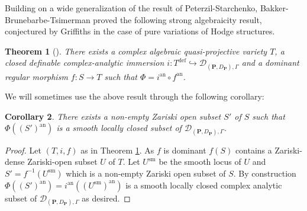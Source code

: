 \documentclass[10pt]{article}
\numberwithin{equation}{subsection}
\theoremstyle{plain}
\newtheorem{theorem}{Theorem}[section]
\newtheorem{corollary}[theorem]{Corollary}
\theoremstyle{definition}
\theoremstyle{remark}
\newcommand{\sm}{\mathrm{sm}}
\newcommand{\pp}{\mathbf P}
\newcommand{\an}{\mathrm{an}}
\newcommand{\period}{\mathscr{D}}
\begin{document}
Building on a wide generalization of the result of Peterzil-Starchenko, Bakker-Brunebarbe-Tsimerman proved the following strong algebraicity result, conjectured by Griffiths in the case of pure variations of Hodge structures.
\begin{theorem}[{\cite[Thm. 1.1]{bbtmixte}}]\label{facto}
There exists a complex algebraic quasi-projective variety $T$, a closed definable complex-analytic immersion $i : T^{\mathrm{def}} \hookrightarrow \period_{(\pp,D_\pp), \Gamma}$ and a dominant regular morphism $f : S \rightarrow T$ such that $\Phi = i^\an \circ f^\an$.
\end{theorem}
We will sometimes use the above result through the following corollary:
\begin{corollary}\label{opensm}
There exists a non-empty Zariski open subset $S'$ of $S$ such that $\Phi((S')^\an)$ is a smooth locally closed subset of $\period_{(\pp, D_\pp),\Gamma}$.
\end{corollary}
\begin{proof}
Let $(T,i,f)$ as in Theorem \ref{facto}. As $f$ is dominant $f(S)$ contains a Zariski-dense Zariski-open subset $U$ of $T$. Let $U^\sm$ be the smooth locus of $U$ and $S' = f^{-1}(U^\sm)$ which is a non-empty Zariski open subset of $S$. By construction $\Phi((S')^\an) = i^\an((U^\sm)^\an)$ is a smooth locally closed complex analytic subset of $\period_{(\pp, D_\pp), \Gamma}$ as desired.
\end{proof}
\end{document}
